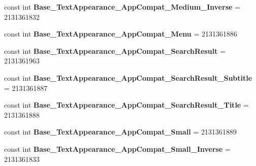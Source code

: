 \begin{DoxyCompactItemize}
\mbox{\label{class_sample_app_1_1_droid_1_1_resource_1_1_style_ae48f70846b7ba236ff7ed5f90152384e}} 
const int {\bfseries Base\+\_\+\+Text\+Appearance\+\_\+\+App\+Compat\+\_\+\+Medium\+\_\+\+Inverse} = 2131361832
\item 
\mbox{\label{class_sample_app_1_1_droid_1_1_resource_1_1_style_a561b536da0f1c30647016413cb62ef7a}} 
const int {\bfseries Base\+\_\+\+Text\+Appearance\+\_\+\+App\+Compat\+\_\+\+Menu} = 2131361886
\item 
\mbox{\label{class_sample_app_1_1_droid_1_1_resource_1_1_style_ac1ad6fceb6b13e7323238b3301a341ef}} 
const int {\bfseries Base\+\_\+\+Text\+Appearance\+\_\+\+App\+Compat\+\_\+\+Search\+Result} = 2131361963
\item 
\mbox{\label{class_sample_app_1_1_droid_1_1_resource_1_1_style_ab6072f2fc4ba11ad55c1224f27411c70}} 
const int {\bfseries Base\+\_\+\+Text\+Appearance\+\_\+\+App\+Compat\+\_\+\+Search\+Result\+\_\+\+Subtitle} = 2131361887
\item 
\mbox{\label{class_sample_app_1_1_droid_1_1_resource_1_1_style_a8cba24caf53996a11c4eb536bfaf2ddf}} 
const int {\bfseries Base\+\_\+\+Text\+Appearance\+\_\+\+App\+Compat\+\_\+\+Search\+Result\+\_\+\+Title} = 2131361888
\item 
\mbox{\label{class_sample_app_1_1_droid_1_1_resource_1_1_style_ade4435e48bd86a822f3aa66794fef3ec}} 
const int {\bfseries Base\+\_\+\+Text\+Appearance\+\_\+\+App\+Compat\+\_\+\+Small} = 2131361889
\item 
\mbox{\label{class_sample_app_1_1_droid_1_1_resource_1_1_style_a7d2b51dc789bff40c1eff63851608714}} 
const int {\bfseries Base\+\_\+\+Text\+Appearance\+\_\+\+App\+Compat\+\_\+\+Small\+\_\+\+Inverse} = 2131361833
\item 
\mbox{\label{class_sample_app_1_1_droid_1_1_resource_1_1_style_a199860641b59a40f6f57aa536bb264ec}} 

\end{DoxyCompactItemize}
